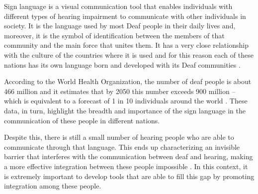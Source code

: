 Sign language is a visual communication tool that enables individuals with different types of hearing impairment to communicate with other individuals in society. It is the language used by most Deaf people in their daily lives and, moreover, it is the symbol of identification between the members of that community and the main force that unites them.  It has a very close relationship with the culture of the countries where it is used and for this reason each of these nations has its own language born and developed with its Deaf communities \cite{pereira-choi-2011}.


According to the World Health Organization, the number of deaf people is about 466 million and it estimates that by 2050 this number exceeds 900 million -- which is equivalent to a forecast of 1 in 10 individuals around the world \cite{who-2018}. These data, in turn, highlight the breadth and importance of the sign language in the communication of these people in different nations.


Despite this, there is still a small number of hearing people who are able to communicate through that language. This ends up characterizing an invisible barrier that interferes with the communication between deaf and hearing, making a more effective integration between these people impossible \cite{peres-2006}. In this context, it is extremely important to develop tools that are able to fill this gap by promoting integration among these people.

